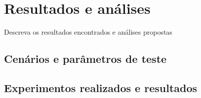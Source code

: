 \chapter{Resultados e análises}\label{cap:imp}

Descreva os resultados encontrados e análises propostas

\section{Cenários e parâmetros de teste}\label{simu}


\section{Experimentos realizados e resultados}\label{sec:4_resultados}

